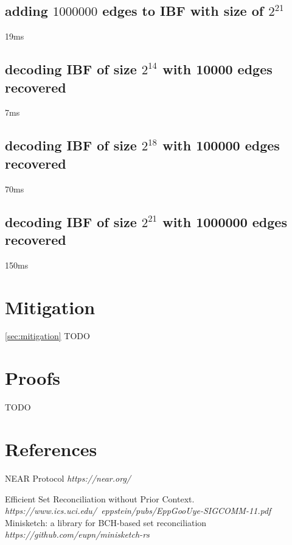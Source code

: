 \documentclass[11pt]{article}
\begin{document}
\subsection{adding $1000000$ edges to IBF with size of $2^21$}
19ms
\subsection{decoding IBF of size $2^14$ with 10000 edges recovered}
7ms
\subsection{decoding IBF of size $2^18$ with 100000 edges recovered}
70ms
\subsection{decoding IBF of size $2^21$ with 1000000 edges recovered}
150ms

\section{Mitigation}\ref{sec:mitigation}
TODO

\section{Proofs}
TODO

\section{References}

\begin{thebibliography}{9}
NEAR Protocol
\textit{https://near.org/}

Efficient Set Reconciliation without Prior Context. 
\textit{https://www.ics.uci.edu/~eppstein/pubs/EppGooUye-SIGCOMM-11.pdf}
Minisketch: a library for BCH-based set reconciliation
\textit{https://github.com/eupn/minisketch-rs}
\end{thebibliography}
\end{document}
